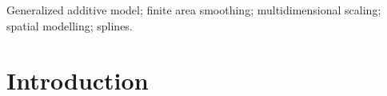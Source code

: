 \documentclass[useAMS, referee]{biom}
\begin{document}
%

\begin{keywords}
Generalized additive model; finite area smoothing; multidimensional scaling; spatial modelling; splines.
\end{keywords}


\maketitle



%
\section{Introduction \label{IN}}
\end{document}
